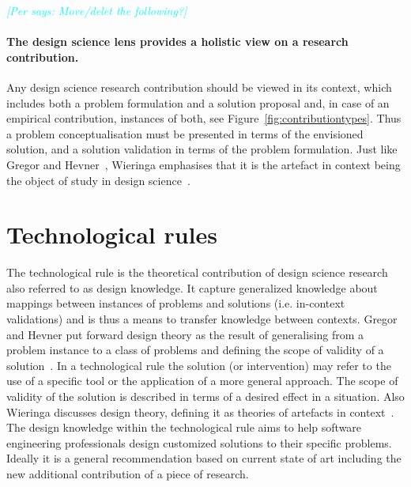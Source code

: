 \documentclass[graybox]{svmult}
\newcommand{\per}[1]{\textcolor{cyan}{{\it [Per says: #1]}}}
\newcommand{\per}[1]{}
\begin{document}
\per{Move/delet the following?}
\paragraph{The design science lens provides a holistic view on a research contribution.} 

Any design science research contribution should be viewed in its context, which includes both a problem formulation and a solution proposal and, in case of an empirical contribution, instances of both, see Figure~\ref{fig:contributiontypes}. Thus a problem conceptualisation must be presented in terms of the envisioned solution, and a solution validation in terms of the problem formulation. 
Just like Gregor and Hevner~\cite{gregor_positioning_2013}, Wieringa emphasises that it is the artefact in context being the object of study in design science~\cite{wieringa_design_2009}.

\section{Technological rules}
\label{sec:technologicalrules}

The technological rule is the theoretical contribution of design science research also referred to as design knowledge. It capture generalized knowledge about mappings between instances of problems and solutions (i.e. in-context validations) and is thus a means to transfer knowledge between contexts. Gregor and Hevner put forward design theory as the result of generalising from a problem instance to a class of problems and defining the scope of validity of a solution~\cite{gregor_positioning_2013}. In a technological rule the solution (or intervention) may refer to the use of a specific tool or the application of a more general approach. The scope of validity of the solution is described in terms of a desired effect in a situation.  Also Wieringa discusses design theory, defining it as theories of artefacts in context~\cite{wieringa_design_2009}. The design knowledge within the technological rule aims to help software engineering professionals design customized solutions to their specific problems. Ideally it is a general recommendation based on current state of art including the new additional contribution of a piece of research.
\end{document}
